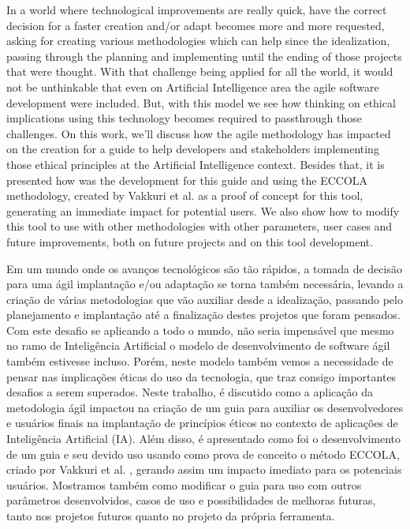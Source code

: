 In a world where technological improvements are really quick, have the correct decision for a faster creation and/or adapt becomes more and more requested, asking for creating various methodologies which can help since the idealization, passing through the planning and implementing until the ending of those projects that were thought. With that challenge being applied for all the world, it would not be unthinkable that even on Artificial Intelligence area the agile software development were included. But, with this model we see how thinking on ethical implications using this technology becomes required to passthrough those challenges. On this work, we'll discuss how the agile methodology has impacted on the creation for a guide to help developers and stakeholders implementing those ethical principles at the Artificial Intelligence context. Besides that, it is presented how was the development for this guide and using the ECCOLA methodology, created by Vakkuri et al. \cite{ECCOLA} as a proof of concept for this tool, generating an immediate impact for potential users. We also show how to modify this tool to use with other methodologies with other parameters, user cases and future improvements, both on future projects and on this tool development.


Em um mundo onde os avanços tecnológicos são tão rápidos, a tomada de decisão para uma ágil implantação e/ou adaptação se torna também necessária, levando a criação de várias metodologias que vão auxiliar desde a idealização, passando pelo planejamento e implantação até a finalização destes projetos que foram pensados. Com este desafio se aplicando a todo o mundo, não seria impensável que mesmo no ramo de Inteligência Artificial o modelo de desenvolvimento de software ágil também estivesse incluso. Porém, neste modelo também vemos a necessidade de pensar nas implicações éticas do uso da tecnologia, que traz consigo importantes desafios a serem superados. Neste trabalho, é discutido como a aplicação da metodologia ágil impactou na criação de um guia para auxiliar os desenvolvedores e usuários finais na implantação de princípios éticos no contexto de aplicações de Inteligência Artificial (IA). Além disso, é apresentado como foi o desenvolvimento de um guia e seu devido uso usando como prova de conceito o método ECCOLA, criado por Vakkuri et al. \cite{ECCOLA}, gerando assim um impacto imediato para os potenciais usuários. Mostramos também como modificar o guia para uso com outros parâmetros desenvolvidos, casos de uso e possibilidades de melhoras futuras, tanto nos projetos futuros quanto no projeto da própria ferramenta.